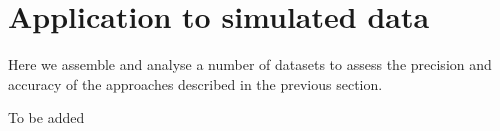 \documentclass{aastex61}
\begin{document}




\section{Application to simulated data} 
\label{sec:simulations}

Here we assemble and analyse a number of datasets to assess the precision and accuracy of the approaches described in the previous section.

\acknowledgments

To be added

%
\end{document}
